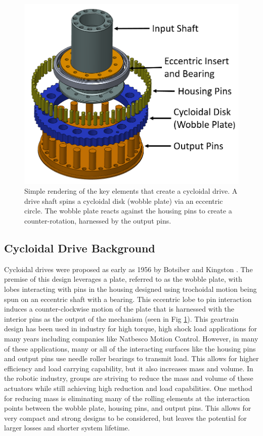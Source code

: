 \begin{figure}[!b]
   \centering
   \includegraphics[width=0.60\linewidth]{images/cycloid_cartoon_v2}
   \caption{Simple rendering of the key elements that create a cycloidal drive.
   A drive shaft spins a cycloidal disk (wobble plate) via an eccentric circle.
   The wobble plate reacts against the housing pins to create a counter-rotation, harnessed by the output pins.}
   \label{cycloid_cartoon}
\end{figure}

\subsection{Cycloidal Drive Background}
Cycloidal drives were proposed as early as 1956 by Botsiber and Kingston \cite{1956}.
The premise of this design leverages a plate, referred to as the wobble plate, with lobes interacting with pins in the housing designed using trochoidal motion being spun on an eccentric shaft with a bearing.
This eccentric lobe to pin interaction induces a counter-clockwise motion of the plate that is harnessed with the interior pins as the output of the mechanism (seen in Fig \ref{cycloid_cartoon}).
This geartrain design has been used in industry for high torque, high shock load applications for many years including companies like Natbesco Motion Control.
However, in many of these applications, many or all of the interacting surfaces like the housing pins and output pins use needle roller bearings to transmit load.
This allows for higher efficiency and load carrying capability, but it also increases mass and volume.
In the robotic industry, groups are striving to reduce the mass and volume of these actuators while still achieving high reduction and load capabilities.
One method for reducing mass is eliminating many of the rolling elements at the interaction points between the wobble plate, housing pins, and output pins.
This allows for very compact and strong designs to be considered, but leaves the potential for larger losses and shorter system lifetime.

